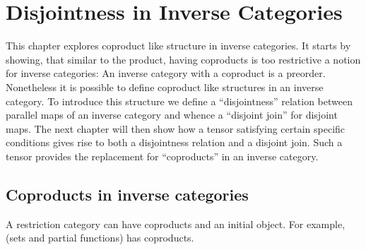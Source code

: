 \chapter{Disjointness in Inverse Categories} %
\label{cha:disjointness_in_inverse_categories}

This chapter explores coproduct like structure in inverse categories. It starts by showing,
that similar to the product, having coproducts is too restrictive a notion for inverse categories: An
inverse category with a coproduct is a preorder.
Nonetheless it is possible to define coproduct like structures in an inverse category. To introduce
this structure we define a ``disjointness'' relation between parallel maps of an inverse category
and whence a ``disjoint join'' for disjoint maps. The  next chapter will then show how a
tensor satisfying certain specific conditions gives rise to both a disjointness relation and a
disjoint join. Such a tensor provides the replacement for ``coproducts'' in an inverse category.



\section{Coproducts in inverse categories} %
\label{sec:coproducts_in_inverse_categories}

A restriction category can have coproducts and an initial object. For example, \Par (sets and
partial functions) has coproducts.

